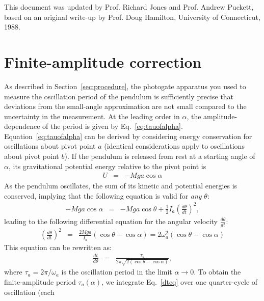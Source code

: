 \documentclass{revtex4}
\begin{document}
\begin{acknowledgments}
This document was updated by Prof. Richard Jones and Prof. Andrew Puckett, based on an original 
write-up by Prof. Doug Hamilton, University of Connecticut, 1988.
\end{acknowledgments}

\appendix
\section{Finite-amplitude correction}
\label{appendixA}
As described in Section~\ref{sec:procedure}, the photogate apparatus you used to measure the
oscillation period of the pendulum is sufficiently precise that
deviations from the small-angle approximation are not small compared
to the uncertainty in the measurement. At the leading order in
$\alpha$, the amplitude-dependence of the period is given by
Eq.~\eqref{eq:tauofalpha}. Equation~\eqref{eq:tauofalpha} can be
derived by considering energy conservation for oscillations about pivot point $a$ (identical
considerations apply to oscillations about pivot point $b$). If the
pendulum is released from rest at a starting angle of $\alpha$, its
gravitational potential energy relative to the pivot point is
\begin{eqnarray}
  U &=& -M g a \cos \alpha
\end{eqnarray}
As the pendulum oscillates, the sum of its kinetic and potential
energies is conserved, implying that the following equation is valid
for \emph{any} $\theta$:
\begin{eqnarray}
  -M g a \cos \alpha &=& -M g a \cos \theta + \frac{1}{2} I_a
  \left(\frac{d\theta}{dt}\right)^2, 
\end{eqnarray}
leading to the following differential equation for the angular
velocity $\frac{d\theta}{dt}$:
\begin{eqnarray}
  \left(\frac{d\theta}{dt}\right)^2 &=& \frac{2Mga}{I_a}\left(\cos
    \theta - \cos \alpha \right) = 2\omega_a^2 \left(\cos
    \theta - \cos \alpha\right)
\end{eqnarray}
This equation can be rewritten as:
\begin{eqnarray}
  \frac{dt}{d\theta} &=& \frac{\tau_a}{2\pi \sqrt{2(\cos \theta - \cos \alpha)}} \label{dteq},
\end{eqnarray}
where $\tau_a = 2\pi/\omega_a$ is the oscillation period
in the limit $\alpha \rightarrow 0$. To obtain the finite-amplitude period $\tau_a(\alpha)$, we integrate
Eq.~\eqref{dteq} over one quarter-cycle of oscillation (each
\end{document}
